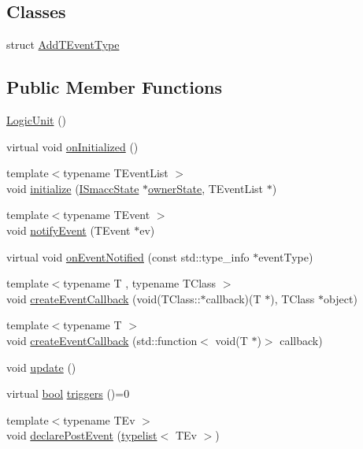 \subsection*{Classes}
\begin{DoxyCompactItemize}
\item 
struct \hyperlink{structsmacc_1_1LogicUnit_1_1AddTEventType}{Add\+T\+Event\+Type}
\end{DoxyCompactItemize}
\subsection*{Public Member Functions}
\begin{DoxyCompactItemize}
\item 
\hyperlink{classsmacc_1_1LogicUnit_a5c015b00d4c0c3d379cfae8e26a1d474}{Logic\+Unit} ()
\item 
virtual void \hyperlink{classsmacc_1_1LogicUnit_ade7f409516683f13754943db1081bac0}{on\+Initialized} ()
\item 
{\footnotesize template$<$typename T\+Event\+List $>$ }\\void \hyperlink{classsmacc_1_1LogicUnit_ad6abed2fa372c64c7ca7330073ef8c95}{initialize} (\hyperlink{classsmacc_1_1ISmaccState}{I\+Smacc\+State} $\ast$\hyperlink{classsmacc_1_1LogicUnit_a8863d227f46868876632b07b500f27d6}{owner\+State}, T\+Event\+List $\ast$)
\item 
{\footnotesize template$<$typename T\+Event $>$ }\\void \hyperlink{classsmacc_1_1LogicUnit_a1c2bee307f2586bc34c0b75fbc4f6fcf}{notify\+Event} (T\+Event $\ast$ev)
\item 
virtual void \hyperlink{classsmacc_1_1LogicUnit_a3a81929b2014b10d0fa28d4bc2d19d9c}{on\+Event\+Notified} (const std\+::type\+\_\+info $\ast$event\+Type)
\item 
{\footnotesize template$<$typename T , typename T\+Class $>$ }\\void \hyperlink{classsmacc_1_1LogicUnit_a58683bd62b8100434dd4a2e4df5382b9}{create\+Event\+Callback} (void(T\+Class\+::$\ast$callback)(T $\ast$), T\+Class $\ast$object)
\item 
{\footnotesize template$<$typename T $>$ }\\void \hyperlink{classsmacc_1_1LogicUnit_a42103eec6907aaa60f297145ba6ca123}{create\+Event\+Callback} (std\+::function$<$ void(T $\ast$)$>$ callback)
\item 
void \hyperlink{classsmacc_1_1LogicUnit_afcec0608a17e039791403472a2411539}{update} ()
\item 
virtual \hyperlink{classbool}{bool} \hyperlink{classsmacc_1_1LogicUnit_ae975a96f0210412e1cb4a7b5b948ade6}{triggers} ()=0
\item 
{\footnotesize template$<$typename T\+Ev $>$ }\\void \hyperlink{classsmacc_1_1LogicUnit_a76ef62bbd4dccf3da2c03032616b3ef6}{declare\+Post\+Event} (\hyperlink{structsmacc_1_1introspection_1_1typelist}{typelist}$<$ T\+Ev $>$)
\end{DoxyCompactItemize}
